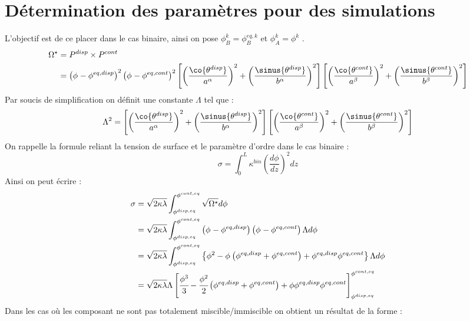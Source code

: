 \chapter{Détermination des paramètres pour des simulations} \label{ann:parametrage}
L'objectif est de ce placer dans le cas binaire, ainsi on pose $\phi_B^k = \phi_{B}^{eq,k}$ et $\phi_A^k = \phi^{k}$
.\begin{align*} 
\Omega^{\star} &= P^{disp} \times P^{cont} \\ 
& = \left(\phi_{}-\phi_{}^{eq,disp}\right)^2\left(\phi_{}-\phi_{}^{eq,cont}\right)^2\left[ \left(\frac{\co{\theta^{disp}}}{a^\alpha}\right)^2 + \left(\frac{\sinus{\theta^{disp}}}{b^\alpha}\right)^2  \right]
\left[ \left(\frac{\co{\theta^{cont}}}{a^\beta}\right)^2 + \left(\frac{\sinus{\theta^{cont}}}{b^\beta}\right)^2  \right]
\end{align*}
Par soucis de simplification on définit une constante $\Lambda$ tel que : 
\begin{equation}
\Lambda^2 = \left[ \left(\frac{\co{\theta^{disp}}}{a^\alpha}\right)^2 + \left(\frac{\sinus{\theta^{disp}}}{b^\alpha}\right)^2  \right]
\left[ \left(\frac{\co{\theta^{cont}}}{a^\beta}\right)^2 + \left(\frac{\sinus{\theta^{cont}}}{b^\beta}\right)^2  \right]
\end{equation}
On rappelle la formule reliant la tension de surface et le paramètre d'ordre dans le cas binaire : 
\begin{equation}
\sigma = \int_0^L\kappa^{bin}\left(\frac{d\phi}{dz}\right)^2dz
\end{equation}
Ainsi on peut écrire :
\begin{align}
\sigma & = \sqrt{2\kappa\lambda}\int_{\phi^{disp,eq}}^{\phi^{cont,eq}}\sqrt{\Omega^{\star}}d\phi \\
\nonumber	& = \sqrt{2\kappa\lambda}\int_{\phi^{disp,eq}}^{\phi^{cont,eq}}\left(\phi_{}-\phi_{}^{eq,disp}\right)\left(\phi_{}-\phi_{}^{eq,cont}\right)\Lambda d\phi \\
\nonumber	& = \sqrt{2\kappa\lambda}\int_{\phi^{disp,eq}}^{\phi^{cont,eq}}\left\{\phi_{}^2 -\phi_{} \left(\phi^{eq,disp} +\phi^{eq,cont} \right) + \phi^{eq,disp}\phi^{eq,cont}\right\}\Lambda d\phi \\
\nonumber	&  = \sqrt{2\kappa\lambda} \Lambda \left[\cfrac{\phi^3}{3} - \cfrac{\phi^2}{2} \left(\phi^{eq,disp} +\phi^{eq,cont} \right) +\phi \phi^{eq,disp}\phi^{eq,cont}      \right]_{\phi^{disp,eq}}^{\phi^{cont,eq}}
\end{align}
Dans les cas où les composant ne sont pas totalement miscible/immiscible on obtient un résultat de la forme :
